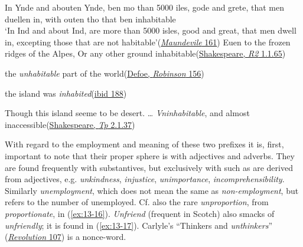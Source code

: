 \ea \label{ex:13-11}
\ea
In Ynde and abouten Ynde, ben mo than 5000 iles, gode and grete, that men duellen in, with outen tho that ben inhabitable\\`In Ind and about Ind, are more than 5000 isles, good and great, that men dwell in, excepting those that are not habitable'\hfill(\href{https://archive.org/details/b2935142x/page/160/mode/2up?view=theater&q=%22Ynde+and+abouten+Ynde%22}{\textit{Maundevile} 161})
\ex
Euen to the frozen ridges of the Alpes, Or any other ground inhabitable\hfill(\href{https://internetshakespeare.uvic.ca/doc/R2_F1/scene/index.html#tln-65}{Shakespeare, \textit{R2} 1.1.65})
\z
\z

\ea \label{ex:13-13}
the \textit{unhabitable} part of the world\hfill(\href{https://archive.org/details/lifeandstranges00dobsgoog/page/n181/mode/2up?q=%22unhabitable%22&view=theater}{Defoe, \textit{Robinson} 156})
\z

\ea \label{ex:13-14}
the island was \textit{inhabited}\hfill(\href{https://archive.org/details/lifeandstranges00dobsgoog/page/n213/mode/2up?q=%22was+inhabited%22&view=theater}{ibid 188})
\z 


\ea \label{ex:13-15}
Though this island seeme to be desert. {\dots} \textit{Vninhabitable}, and almost inaccessible\hfill(\href{https://internetshakespeare.uvic.ca/doc/Tmp_F1/scene/2.1/index.html#tln-710}{Shakespeare, \textit{Tp} 2.1.37})
\z

With regard to the employment and meaning of these two prefixes it is, first, important to note that their proper sphere is with adjectives and adverbs. They are found frequently with substantives, but exclusively with such as are derived from adjectives, e.g. \textit{unkindness}, \textit{injustice}, \textit{unimportance}, \textit{incomprehensibility}. Similarly \textit{unemployment}, which does not mean the same as \textit{non-employment}, %
but refers to the number of unemployed. Cf. also the rare \textit{unproportion}, from \textit{proportionate}, in (\ref{ex:13-16}). \textit{Unfriend} (frequent in Scotch) %
also smacks of \textit{unfriendly}; it is found in (\ref{ex:13-17}). Carlyle's ``Thinkers and \textit{unthinkers}'' (\href{https://archive.org/details/gri_33125008092856/page/n109/mode/2up?q=%22thinkers+and+unthinkers%22&view=theater}{\textit{Revolution} 107}) is a nonce-word. %

